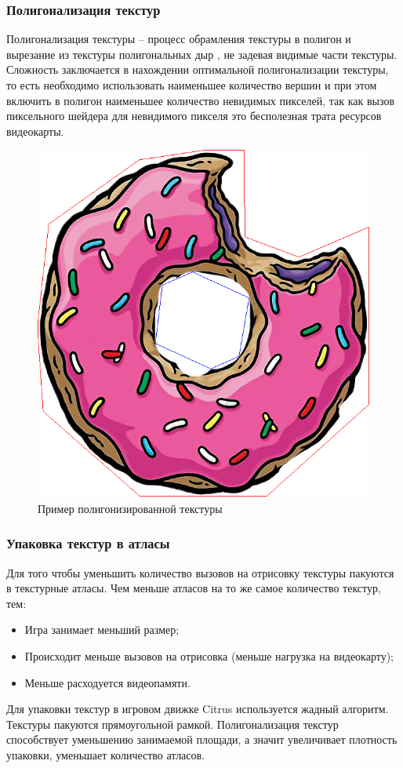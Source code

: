 \documentclass{fefu_thesis/cls/fefu}
\begin{document}
    \subsubsection{Полигонализация текстур}
    Полигонализация текстуры -- процесс обрамления текстуры в полигон и вырезание из текстуры полигональных дыр , не задевая видимые части текстуры. Сложность заключается в нахождении оптимальной полигонализации текстуры, то есть необходимо использовать наименьшее количество вершин и при этом включить в полигон наименьшее количество невидимых пикселей, так как вызов пиксельного шейдера для невидимого пикселя это бесполезная трата ресурсов видеокарты.
    \begin{figure}[H]
        \centering
        \includegraphics[scale=0.5]{images/donut_polygonized.png}
        \caption{Пример полигонизированной текстуры}
    \end{figure}
    \subsubsection{Упаковка текстур в атласы}
    Для того чтобы уменьшить количество вызовов на отрисовку текстуры пакуются в текстурные атласы. Чем меньше атласов на то же самое количество текстур, тем:
    \begin{itemize}
        \item Игра занимает меньший размер;
        \item Происходит меньше вызовов на отрисовка (меньше нагрузка на видеокарту);
        \item Меньше расходуется видеопамяти.
    \end{itemize}
    Для упаковки текстур в игровом движке Citrus используется жадный алгоритм. Текстуры пакуются прямоугольной рамкой. Полигонализация текстур способствует уменьшению занимаемой площади, а значит увеличивает плотность упаковки, уменьшает количество атласов.
\end{document}

